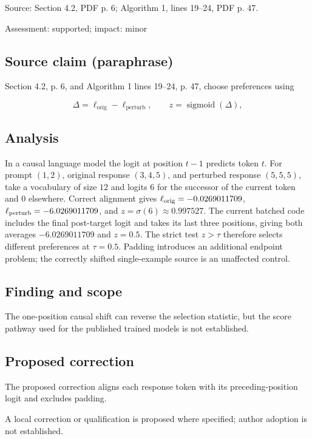 \documentclass[11pt]{article}
\begin{document}
Source: Section 4.2, PDF p. 6; Algorithm 1, lines 19–24, PDF p. 47.

Assessment: supported; impact: minor

\subsection*{Source claim (paraphrase)}

Section 4.2, p. 6, and Algorithm 1 lines 19–24, p. 47, choose preferences using

\[ \Delta=\ell_{\mathrm{orig}}-\ell_{\mathrm{perturb}}, \qquad z=\operatorname{sigmoid}(\Delta), \]

\subsection*{Analysis}

In a causal language model the logit at position \(t-1\) predicts token \(t\). For prompt \((1,2)\), original response \((3,4,5)\), and perturbed response \((5,5,5)\), take a vocabulary of size \(12\) and logits \(6\) for the successor of the current token and \(0\) elsewhere. Correct alignment gives \(\ell_{\rm orig}=-0.0269011709\), \(\ell_{\rm perturb}=-6.0269011709\), and \(z=\sigma(6)\approx0.997527\). The current batched code includes the final post-target logit and takes its last three positions, giving both averages \(-6.0269011709\) and \(z=0.5\). The strict test \(z>\tau\) therefore selects different preferences at \(\tau=0.5\). Padding introduces an additional endpoint problem; the correctly shifted single-example source is an unaffected control.

\subsection*{Finding and scope}

The one-position causal shift can reverse the selection statistic, but the score pathway used for the published trained models is not established.

\subsection*{Proposed correction}

The proposed correction aligns each response token with its preceding-position logit and excludes padding.

A local correction or qualification is proposed where specified; author adoption is not established.
\end{document}
